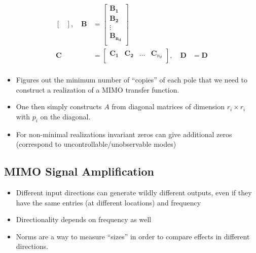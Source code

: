 \begin{enumerate}
\begin{align*}
\begin{bmatrix}
                            \end{bmatrix},\quad
              \mathbf{B} & =\begin{bmatrix}
                                \mathbf{B_1}     \\
                                \mathbf{B_2}     \\
                                \vdots           \\
                                \mathbf{B_{n_d}} \\
                            \end{bmatrix}                                                                               \\
              \mathbf{C} & =\begin{bmatrix}
                                \mathbf{C_1} & \mathbf{C_2} & \dots & \mathbf{C}_{n_d} \\
                            \end{bmatrix}, \quad
              \mathbf{D} & = \mathbf{D}                                                                                                           \\
          \end{align*}
\end{enumerate}


\begin{itemize}
    \item Figures out the minimum number of ``copies'' of each pole that we need to construct a realization of a MIMO transfer function.
    \item One then simply constructs $A$ from diagonal matrices of dimension $r_i\times r_i$ with $p_i$ on the diagonal.
    \item For non-minimal realizations invariant zeros can give additional zeros (correspond to uncontrollable/unobservable modes)
\end{itemize}

\subsection{MIMO Signal Amplification}


\begin{itemize}
    \item Different input directions can generate wildly different outputs, even if they have the same entries (at different locations) and frequency
    \item Directionality depends on frequency as well
    \item Norms are a way to measure ``sizes'' in order to compare effects in different directions.
\end{itemize}

